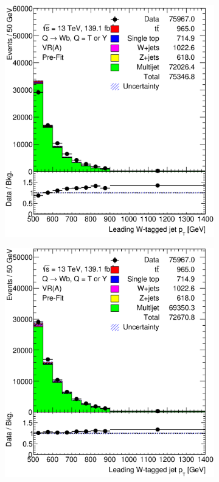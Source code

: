 \begin{figure}[hbt!]
	\centering
	\begin{subfigure}{.35\textwidth}
		\centering
		\includegraphics[width=\linewidth,height=\textheight,keepaspectratio]{figs/chapter5/prefitintegral/VR_B_ljet_pt.eps}
		\caption{}
		\label{fig:abcd:correctionfactor:integral:ljet_pt}
	\end{subfigure}\hspace{0.6cm}
	\begin{subfigure}{.35\textwidth}
		\centering
		\includegraphics[width=\linewidth,height=\textheight,keepaspectratio]{figs/chapter5/prefitbinbybin/VR_B_ljet_pt.eps}

\end{subfigure}
\end{figure}
